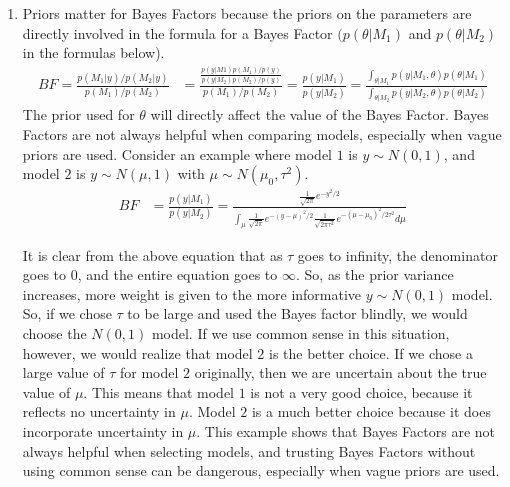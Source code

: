 \documentclass[12pt]{article}\usepackage[]{graphicx}\usepackage[]{color}
\begin{document}
\begin{doublespacing}
\begin{enumerate}
\begin{enumerate}
\end{enumerate}

\item Priors matter for Bayes Factors because the priors on the parameters are directly involved in the formula for a Bayes Factor $(p(\theta|M_1)$ and $p(\theta|M_2)$ in the formulas below). 
\begin{align*}
BF = \frac{p(M_1|y)/p(M_2|y)}{p(M_1)/p(M_2)} &= \frac{\frac{p(y|M1)p(M_1)/p(y)}{p(y|M_2)p(M_2)/p(y)}}{p(M_1)/p(M_2)} = \frac{p(y|M_1)}{p(y|M_2)} = \frac{\int_{\theta|M_1} p(y|M_1, \theta) p(\theta|M_1)}{\int_{\theta|M_2} p(y|M_2, \theta) p(\theta|M_2)}
\end{align*}
The prior used for $\theta$ will directly affect the value of the Bayes Factor. Bayes Factors are not always helpful when comparing models, especially when vague priors are used. Consider an example where model $1$ is $y \sim N(0,1)$, and model $2$ is $y \sim N(\mu, 1)$ with $\mu \sim N(\mu_0, \tau^2)$.
\begin{align*}
BF &= \frac{p(y|M_1)}{p(y|M_2)} = \frac{\frac{1}{\sqrt{2\pi}} e^{-y^2/2}}{\int_{\mu} \frac{1}{\sqrt{2\pi}} e^{-(y-\mu)^2/2} \frac{1}{\sqrt{2\pi\tau^2}} e^{-(\mu-\mu_0)^2/2\tau^2}d\mu}
\end{align*}

It is clear from the above equation that as $\tau$ goes to infinity, the denominator goes to $0$, and the entire equation goes to $\infty$. So, as the prior variance increases, more weight is given to the more informative $y \sim N(0, 1)$ model. So, if we chose $\tau$ to be large and used the Bayes factor blindly, we would choose the $N(0,1)$ model. If we use common sense in this situation, however, we would realize that model $2$ is the better choice. If we chose a large value of $\tau$ for model $2$ originally, then we are uncertain about the true value of $\mu$. This means that model $1$ is not a very good choice, because it reflects no uncertainty in $\mu$. Model $2$ is a much better choice because it does incorporate uncertainty in $\mu$. This example shows that Bayes Factors are not always helpful when selecting models, and trusting Bayes Factors without using common sense can be dangerous, especially when vague priors are used.



\end{enumerate}
\end{doublespacing}
\end{document}
